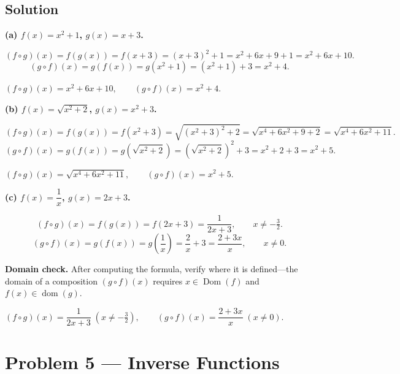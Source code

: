 \documentclass[12pt, a4paper]{article}
\begin{document}
\subsection*{Solution}

\textbf{(a)\; $f(x) = x^2 + 1$, \;$g(x) = x + 3$.}

\[
  (f \circ g)(x) = f(g(x)) = f(x+3) = (x+3)^2 + 1 = x^2 + 6x + 9 + 1 = x^2 + 6x + 10.
\]
\[
  (g \circ f)(x) = g(f(x)) = g(x^2+1) = (x^2+1) + 3 = x^2 + 4.
\]

\begin{answerbox}
$(f \circ g)(x) = x^2 + 6x + 10, \qquad (g \circ f)(x) = x^2 + 4.$
\end{answerbox}

\bigskip
\textbf{(b)\; $f(x) = \sqrt{x^2 + 2}$, \;$g(x) = x^2 + 3$.}

\[
  (f \circ g)(x) = f(g(x)) = f(x^2 + 3) = \sqrt{(x^2+3)^2 + 2} = \sqrt{x^4 + 6x^2 + 9 + 2} = \sqrt{x^4 + 6x^2 + 11}.
\]
\[
  (g \circ f)(x) = g(f(x)) = g\!\left(\sqrt{x^2+2}\right) = \left(\sqrt{x^2+2}\right)^2 + 3 = x^2 + 2 + 3 = x^2 + 5.
\]

\begin{answerbox}
$(f \circ g)(x) = \sqrt{x^4 + 6x^2 + 11}, \qquad (g \circ f)(x) = x^2 + 5.$
\end{answerbox}

\bigskip
\textbf{(c)\; $f(x) = \dfrac{1}{x}$, \;$g(x) = 2x + 3$.}

\[
  (f \circ g)(x) = f(g(x)) = f(2x+3) = \frac{1}{2x+3}, \qquad x \neq -\tfrac{3}{2}.
\]
\[
  (g \circ f)(x) = g(f(x)) = g\!\left(\frac{1}{x}\right) = \frac{2}{x} + 3 = \frac{2 + 3x}{x}, \qquad x \neq 0.
\]

\textbf{Domain check.}\; After computing the formula, verify where it is defined---the domain of a composition $(g \circ f)(x)$ requires $x \in \operatorname{Dom}(f)$ and $f(x) \in \operatorname{dom}(g)$.

\begin{answerbox}
$(f \circ g)(x) = \dfrac{1}{2x+3}\;(x \neq -\frac{3}{2}), \qquad
 (g \circ f)(x) = \dfrac{2+3x}{x}\;(x \neq 0).$
\end{answerbox}

\newpage
\section{Problem 5 --- Inverse Functions}
\end{document}
